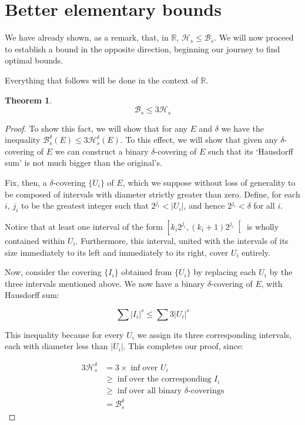 \documentclass[11pt]{amsart}
\newcommand{\R}{\mathbb{R}}
\newcommand{\HH}{\mathcal{H}}
\newcommand{\BB}{\mathcal{B}}
\newtheorem{theorem}{Theorem}
\begin{document}
\section{Better elementary bounds}

We have already shown, as a remark, that, in $\R$, $\HH_s \leq \BB_s$. We will now proceed to establish a bound in the opposite direction, beginning our journey to find optimal bounds.

Everything that follows will be done in the context of $\R$.

\begin{theorem}
\[ \BB_s \leq 3 \HH_s \]
\end{theorem}

\begin{proof}
To show this fact, we will show that for any $E$ and $\delta$ we have the inequality $\BB_s^\delta(E) \leq 3 \HH_s^\delta(E)$. To this effect, we will show that given any $\delta$-covering of $E$ we can construct a binary $\delta$-covering of $E$ such that its `Hausdorff sum' is not much bigger than the original's.

Fix, then, a $\delta$-covering $\{U_i\}$ of $E$, which we suppose without loss of generality to be composed of intervals with diameter strictly greater than zero. Define, for each $i$, $j_i$ to be the greatest integer such that $2^{j_i} < \lvert U_i \rvert$, and hence $2^{j_i} < \delta$ for all $i$.

Notice that at least one interval of the form $\left[ k_i 2^{j_i}, (k_i + 1) 2^{j_i} \right[$ is wholly contained within $U_i$. Furthermore, this interval, united with the intervals of its size immediately to its left and immediately to its right, cover $U_i$ entirely.

Now, consider the covering $\{I_i\}$ obtained from $\{U_i\}$ by replacing each $U_i$ by the three intervals mentioned above. We now have a binary $\delta$-covering of $E$, with Hausdorff sum:

\[\sum \lvert I_i \rvert^s \leq \sum 3 \lvert U_i \rvert^s\]

This inequality because for every $U_i$ we assign its three corresponding intervals, each with diameter less than $\lvert U_i \rvert$. This completes our proof, since:

\begin{align*}
3 \HH_s^\delta &= 3 \times \inf \text{over $U_i$}\\
&\geq \inf \text{over the corresponding $I_i$}\\
&\geq \inf \text{over all binary $\delta$-coverings}\\
&= \BB_s^\delta
\end{align*}

\end{proof}
\end{document}
